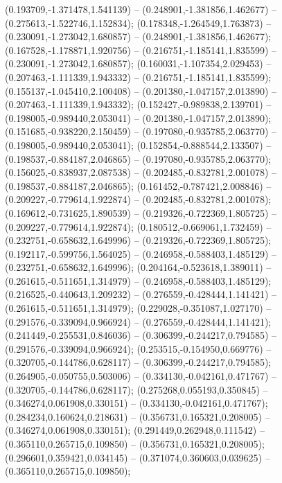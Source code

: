  (0.193709,-1.371478,1.541139) -- (0.248901,-1.381856,1.462677) -- (0.275613,-1.522746,1.152834);
 (0.178348,-1.264549,1.763873) -- (0.230091,-1.273042,1.680857) -- (0.248901,-1.381856,1.462677);
 (0.167528,-1.178871,1.920756) -- (0.216751,-1.185141,1.835599) -- (0.230091,-1.273042,1.680857);
 (0.160031,-1.107354,2.029453) -- (0.207463,-1.111339,1.943332) -- (0.216751,-1.185141,1.835599);
 (0.155137,-1.045410,2.100408) -- (0.201380,-1.047157,2.013890) -- (0.207463,-1.111339,1.943332);
 (0.152427,-0.989838,2.139701) -- (0.198005,-0.989440,2.053041) -- (0.201380,-1.047157,2.013890);
 (0.151685,-0.938220,2.150459) -- (0.197080,-0.935785,2.063770) -- (0.198005,-0.989440,2.053041);
 (0.152854,-0.888544,2.133507) -- (0.198537,-0.884187,2.046865) -- (0.197080,-0.935785,2.063770);
 (0.156025,-0.838937,2.087538) -- (0.202485,-0.832781,2.001078) -- (0.198537,-0.884187,2.046865);
 (0.161452,-0.787421,2.008846) -- (0.209227,-0.779614,1.922874) -- (0.202485,-0.832781,2.001078);
 (0.169612,-0.731625,1.890539) -- (0.219326,-0.722369,1.805725) -- (0.209227,-0.779614,1.922874);
 (0.180512,-0.669061,1.732459) -- (0.232751,-0.658632,1.649996) -- (0.219326,-0.722369,1.805725);
 (0.192117,-0.599756,1.564025) -- (0.246958,-0.588403,1.485129) -- (0.232751,-0.658632,1.649996);
 (0.204164,-0.523618,1.389011) -- (0.261615,-0.511651,1.314979) -- (0.246958,-0.588403,1.485129);
 (0.216525,-0.440643,1.209232) -- (0.276559,-0.428444,1.141421) -- (0.261615,-0.511651,1.314979);
 (0.229028,-0.351087,1.027170) -- (0.291576,-0.339094,0.966924) -- (0.276559,-0.428444,1.141421);
 (0.241449,-0.255531,0.846036) -- (0.306399,-0.244217,0.794585) -- (0.291576,-0.339094,0.966924);
 (0.253515,-0.154950,0.669776) -- (0.320705,-0.144786,0.628117) -- (0.306399,-0.244217,0.794585);
 (0.264905,-0.050755,0.503006) -- (0.334130,-0.042161,0.471767) -- (0.320705,-0.144786,0.628117);
 (0.275268,0.055193,0.350845) -- (0.346274,0.061908,0.330151) -- (0.334130,-0.042161,0.471767);
 (0.284234,0.160624,0.218631) -- (0.356731,0.165321,0.208005) -- (0.346274,0.061908,0.330151);
 (0.291449,0.262948,0.111542) -- (0.365110,0.265715,0.109850) -- (0.356731,0.165321,0.208005);
 (0.296601,0.359421,0.034145) -- (0.371074,0.360603,0.039625) -- (0.365110,0.265715,0.109850);
